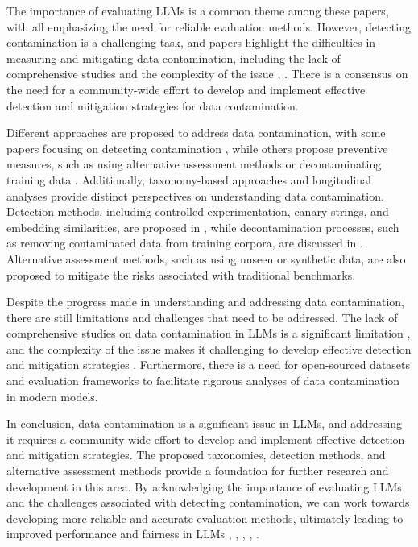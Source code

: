 \documentclass[conference]{IEEEtran}
\begin{document}
The importance of evaluating LLMs is a common theme among these papers, with all emphasizing the need for reliable evaluation methods. However, detecting contamination is a challenging task, and papers highlight the difficulties in measuring and mitigating data contamination, including the lack of comprehensive studies and the complexity of the issue \cite{b1}, \cite{b2}. There is a consensus on the need for a community-wide effort to develop and implement effective detection and mitigation strategies for data contamination.

Different approaches are proposed to address data contamination, with some papers focusing on detecting contamination \cite{b4}, while others propose preventive measures, such as using alternative assessment methods or decontaminating training data \cite{b5}. Additionally, taxonomy-based approaches \cite{b2} and longitudinal analyses \cite{b3} provide distinct perspectives on understanding data contamination. Detection methods, including controlled experimentation, canary strings, and embedding similarities, are proposed in \cite{b4}, while decontamination processes, such as removing contaminated data from training corpora, are discussed in \cite{b5}. Alternative assessment methods, such as using unseen or synthetic data, are also proposed to mitigate the risks associated with traditional benchmarks.

Despite the progress made in understanding and addressing data contamination, there are still limitations and challenges that need to be addressed. The lack of comprehensive studies on data contamination in LLMs is a significant limitation \cite{b1}, and the complexity of the issue makes it challenging to develop effective detection and mitigation strategies \cite{b2}. Furthermore, there is a need for open-sourced datasets and evaluation frameworks to facilitate rigorous analyses of data contamination in modern models.

In conclusion, data contamination is a significant issue in LLMs, and addressing it requires a community-wide effort to develop and implement effective detection and mitigation strategies. The proposed taxonomies, detection methods, and alternative assessment methods provide a foundation for further research and development in this area. By acknowledging the importance of evaluating LLMs and the challenges associated with detecting contamination, we can work towards developing more reliable and accurate evaluation methods, ultimately leading to improved performance and fairness in LLMs \cite{b1}, \cite{b2}, \cite{b3}, \cite{b4}, \cite{b5}.
\end{document}
